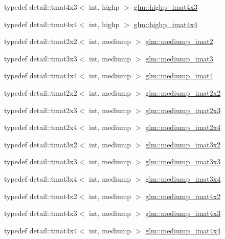 \begin{DoxyCompactItemize}
typedef detail\+::tmat4x3$<$ int, highp $>$ \hyperlink{group__gtc__matrix__integer_ga9d51b6f1c8cd0b23c6fcc8dca924b14c}{glm\+::highp\+\_\+imat4x3}
\item 
typedef detail\+::tmat4x4$<$ int, highp $>$ \hyperlink{group__gtc__matrix__integer_ga969c88d5c7530beb80768205a054ee80}{glm\+::highp\+\_\+imat4x4}
\item 
typedef detail\+::tmat2x2$<$ int, mediump $>$ \hyperlink{group__gtc__matrix__integer_gaec03a8eef2ec2536f8bebffd0bac8192}{glm\+::mediump\+\_\+imat2}
\item 
typedef detail\+::tmat3x3$<$ int, mediump $>$ \hyperlink{group__gtc__matrix__integer_ga6b438ab863af0122b532adc93b89105e}{glm\+::mediump\+\_\+imat3}
\item 
typedef detail\+::tmat4x4$<$ int, mediump $>$ \hyperlink{group__gtc__matrix__integer_gabf1a0fd4c85a21f67535b737e1feb355}{glm\+::mediump\+\_\+imat4}
\item 
typedef detail\+::tmat2x2$<$ int, mediump $>$ \hyperlink{group__gtc__matrix__integer_ga472222f6e3754124ee9cb64acaaedac1}{glm\+::mediump\+\_\+imat2x2}
\item 
typedef detail\+::tmat2x3$<$ int, mediump $>$ \hyperlink{group__gtc__matrix__integer_gabc92c714c2d257213c5b0771669df177}{glm\+::mediump\+\_\+imat2x3}
\item 
typedef detail\+::tmat2x4$<$ int, mediump $>$ \hyperlink{group__gtc__matrix__integer_ga90b020de8489a1d4424c0ffcc17c83dd}{glm\+::mediump\+\_\+imat2x4}
\item 
typedef detail\+::tmat3x2$<$ int, mediump $>$ \hyperlink{group__gtc__matrix__integer_ga2a90775c74656b8a825f24d510f0ea5d}{glm\+::mediump\+\_\+imat3x2}
\item 
typedef detail\+::tmat3x3$<$ int, mediump $>$ \hyperlink{group__gtc__matrix__integer_gac5ee8dc182055bb0a00a90c031d4a714}{glm\+::mediump\+\_\+imat3x3}
\item 
typedef detail\+::tmat3x4$<$ int, mediump $>$ \hyperlink{group__gtc__matrix__integer_gaaac79be4db34dde570c3331ffe728d55}{glm\+::mediump\+\_\+imat3x4}
\item 
typedef detail\+::tmat4x2$<$ int, mediump $>$ \hyperlink{group__gtc__matrix__integer_gacdae7d6ae4820756c62c2b5fd5c0370a}{glm\+::mediump\+\_\+imat4x2}
\item 
typedef detail\+::tmat4x3$<$ int, mediump $>$ \hyperlink{group__gtc__matrix__integer_ga5032ee978a55aa0db4842d5c3cbeade0}{glm\+::mediump\+\_\+imat4x3}
\item 
typedef detail\+::tmat4x4$<$ int, mediump $>$ \hyperlink{group__gtc__matrix__integer_gafa2df6be3aad055867b9bfea34e9c4a0}{glm\+::mediump\+\_\+imat4x4}

\end{DoxyCompactItemize}
